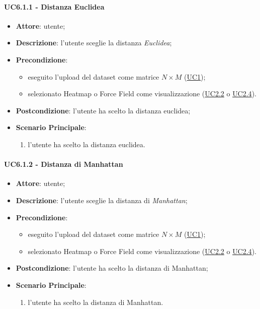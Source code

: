     \paragraph{UC6.1.1 - Distanza Euclidea}
    \label{uc6.1.1}
    \begin{itemize}
    \item \textbf{Attore}: utente;
    \item \textbf{Descrizione}: l'utente sceglie la distanza \emph{Euclidea};
    \item \textbf{Precondizione}: 
    \begin{itemize}
        \item eseguito l'upload del dataset come matrice $N\times M$ (\hyperref[uc1]{UC1});
        \item selezionato Heatmap o Force Field come visualizzazione (\hyperref[uc2.2]{UC2.2} o \hyperref[uc2.4]{UC2.4}).
    \end{itemize}  
    \item \textbf{Postcondizione}: l'utente ha scelto la distanza euclidea;
    \item \textbf{Scenario Principale}: 
    \begin{enumerate}
        \item l'utente ha scelto la distanza euclidea.
    \end{enumerate}
    \end{itemize}
    
    \paragraph{UC6.1.2 - Distanza di Manhattan}
    \label{uc6.1.2}
    \begin{itemize}
    \item \textbf{Attore}: utente;
    \item \textbf{Descrizione}: l'utente sceglie la distanza di \emph{Manhattan};
    \item \textbf{Precondizione}: 
    \begin{itemize}
        \item eseguito l'upload del dataset come matrice $N\times M$ (\hyperref[uc1]{UC1});
        \item selezionato Heatmap o Force Field come visualizzazione (\hyperref[uc2.2]{UC2.2} o \hyperref[uc2.4]{UC2.4}).
    \end{itemize}  
    \item \textbf{Postcondizione}: l'utente ha scelto la distanza di Manhattan;
    \item \textbf{Scenario Principale}: 
    \begin{enumerate}
        \item l'utente ha scelto la distanza di Manhattan.
    \end{enumerate}
    \end{itemize}